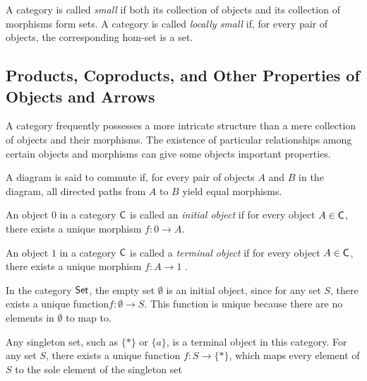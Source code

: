 \begin{definition}
  A category is called \emph{small} if both its collection of objects and its collection of morphisms form sets.
A category is called \emph{locally small} if, for every pair of objects, the corresponding hom-set is a set.
\end{definition}








\subsection{Products, Coproducts, and Other Properties of Objects and Arrows}

 A category frequently possesses a more intricate structure than a mere collection of objects and their morphisms. The existence of particular relationships among certain objects and morphisms can give some objects important properties.

A diagram is said to commute if, for every pair of objects $A$ and $B$ in the diagram, all directed paths from 
$A$ to $B$ yield equal morphisms.

\begin{definition}
  An object \( 0 \) in a category \( \mathsf{C} \) is called an \emph{initial object} if for every object \( A \in \mathsf{C}  \), there exists a unique morphism  $f: 0 \to A $.

\end{definition}

\begin{definition}
  An object \( 1 \) in a category \( \mathsf{C}  \) is called a \emph{terminal object} if for every object \( A \in \mathsf{C}  \), there exists a unique morphism $ f: A \to 1 $ .
\end{definition}

\begin{example}
In the category \( \mathsf{Set} \), the empty set \( \emptyset \) is an initial object, since for any set \( S \), there exists a unique function$f : \emptyset \to S.$
This function is unique because there are no elements in \( \emptyset \) to map to.

Any singleton set, such as \( \{*\} \) or \( \{a\} \), is a terminal object in this category. For any set \( S \), there exists a unique function $f : S \to \{*\}$,
which maps every element of \( S \) to the sole element of the singleton set
\end{example}

